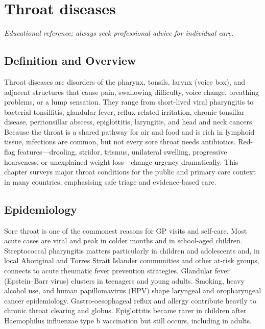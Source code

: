 \chapter{Throat diseases}

\medskip
\noindent\textit{Educational reference; always seek professional advice for individual care.}

\section*{Definition and Overview}
Throat diseases are disorders of the pharynx, tonsils, larynx (voice box), and adjacent structures that cause pain, swallowing difficulty, voice change, breathing problems, or a lump sensation. They range from short-lived viral pharyngitis to bacterial tonsillitis, glandular fever, reflux-related irritation, chronic tonsillar disease, peritonsillar abscess, epiglottitis, laryngitis, and head and neck cancers. Because the throat is a shared pathway for air and food and is rich in lymphoid tissue, infections are common, but not every sore throat needs antibiotics. Red-flag features---drooling, stridor, trismus, unilateral swelling, progressive hoarseness, or unexplained weight loss---change urgency dramatically. This chapter surveys major throat conditions for the public and primary care context in many countries, emphasising safe triage and evidence-based care.

\section*{Epidemiology}
Sore throat is one of the commonest reasons for GP visits and self-care. Most acute cases are viral and peak in colder months and in school-aged children. Streptococcal pharyngitis matters particularly in children and adolescents and, in local Aboriginal and Torres Strait Islander communities and other at-risk groups, connects to acute rheumatic fever prevention strategies. Glandular fever (Epstein--Barr virus) clusters in teenagers and young adults. Smoking, heavy alcohol use, and human papillomavirus (HPV) shape laryngeal and oropharyngeal cancer epidemiology. Gastro-oesophageal reflux and allergy contribute heavily to chronic throat clearing and globus. Epiglottitis became rarer in children after Haemophilus influenzae type b vaccination but still occurs, including in adults.

